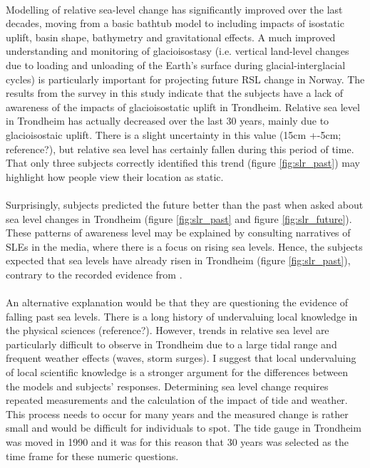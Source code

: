 \paragraph{}
Modelling of relative sea-level change has significantly improved over the last decades, moving from a basic bathtub model to including impacts of isostatic uplift, basin shape,  bathymetry and gravitational effects. A much improved understanding and monitoring of glacioisostasy (i.e. vertical land-level changes due to loading and unloading of the Earth's surface during glacial-interglacial cycles) is particularly important for projecting future RSL change in Norway. The results from the survey in this study indicate that the subjects have a lack of awareness of the impacts of glacioisostatic uplift in Trondheim. Relative sea level in Trondheim has actually decreased over the last 30 years, mainly due to glacioisostaic uplift. There is a slight uncertainty in this value (15cm +-5cm; reference?), but relative sea level has certainly fallen during this period of time. That only three subjects correctly identified this trend (figure \ref{fig:slr_past}) may highlight how people view their location as static.

\paragraph{}
Surprisingly, subjects predicted the future better than the past when asked about sea level changes in Trondheim (figure \ref{fig:slr_past} and figure \ref{fig:slr_future}). These patterns of awareness level may be explained by consulting narratives of SLEs in the media, where there is a focus on rising sea levels. Hence, the subjects expected that sea levels have already risen in Trondheim (figure \ref{fig:slr_past}), contrary to the recorded evidence from \cite{tides_high_2022}.


\paragraph{}
An alternative explanation would be that they are questioning the evidence of falling past sea levels. There is a long history of undervaluing local knowledge in the physical sciences (reference?). However, trends in relative sea level are particularly difficult to observe in Trondheim due to a large tidal range and frequent weather effects (waves, storm surges). I suggest that local undervaluing of local scientific knowledge is a stronger argument for the differences between the models and subjects' responses. Determining sea level change requires repeated measurements and the calculation of the impact of tide and weather. This process needs to occur for many years and the measured change is rather small and would be difficult for individuals to spot. The tide gauge in Trondheim was moved in 1990 and it was for this reason that 30 years was selected as the time frame for these numeric questions. 

